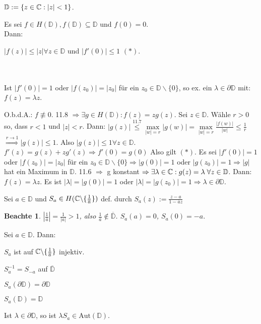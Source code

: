 \documentclass[a4paper,twoside,DIV15,BCOR12mm]{scrbook}
\def\MdD{\mathbb{D}}
\def\Rand{\partial}
\def\Aut{\text{Aut}}
\newtheorem{beachte}{Beachte}
\begin{document}
$\MdD := \{ z\in\MdC: |z|<1\}$.

\begin{satz}
Es sei $f\in H(\MdD), f(\MdD) \subseteq \MdD$ und $f(0) = 0$. \\
Dann: \\  \centerline{$|f(z)| \leq |z| \forall z \in \MdD$ und $|f'(0)|\leq 1$ $(*)$. } \\  \\ Ist $|f'(0)|=1$ oder $|f(z_0)| = |z_0|$ für ein $z_0 \in \MdD \backslash \{0\}$, so ex. ein $\lambda \in \Rand \MdD$ mit: $f(z)=\lambda z$.
\end{satz}

\begin{beweis}
O.b.d.A.: $f\not\equiv 0$. 11.8 $\Rightarrow \exists g \in H(\MdD): f(z) = zg(z)$. Sei $z \in \MdD$. Wähle $r>0$ so, dass $r<1$ und $|z| < r$. Dann: $|g(z)| \stackrel{\text{11.7}}{\leq} \max\limits_{|w|=r} |g(w)| = \max\limits_{|w|=r} \frac{|f(w)|}{|w|} \leq \frac{1}{r} $ $\stackrel{r \rightarrow 1}{\Rightarrow} |g(z)| \leq1$. Also $|g(z)| \leq 1 \forall z \in \MdD$. 
$f'(z) = g(z) + zg'(z) \Rightarrow f'(0) = g(0)$ Also gilt $(*)$.
Es sei $|f'(0)| = 1$ oder $|f(z_0)| = |z_0|$ für ein $z_0 \in \MdD \backslash \{0\} \Rightarrow  |g(0)| = 1$ oder $|g(z_0)| = 1 \Rightarrow |g|$ hat ein Maximum in $\MdD$. 11.6 $\Rightarrow$ g konstant $\Rightarrow \exists \lambda \in \MdC: g(z) = \lambda \;\forall z \in \MdD$. Dann: $f(z) = \lambda z$. Es ist $|\lambda| = |g(0)| = 1$ oder $|\lambda| = |g(z_0)| = 1 \Rightarrow \lambda \in \partial \MdD$.
\end{beweis}

\begin{definition}
Sei $a\in\MdD$ und $S_a \in H(\mathbb{C} \backslash \{ \frac{1}{\overline{a}}\})$ def. durch $S_a(z) := \frac{z-a}{1-\overline{a}z}$
\end{definition}

\begin{beachte}
$|\frac{1}{\overline{a}}| = \frac{1}{|a|} > 1$, also $\frac{1}{\overline{a}} \notin \overline{\MdD}$. $S_a(a) = 0$, $S_a(0) = -a$.
\end{beachte}

\begin{satz}
Sei $a \in \MdD$. Dann:
\begin{liste}
\item $S_a$ ist auf $\mathbb{C} \backslash \{\frac{1}{\overline{a}}\}$ injektiv.
\item $S_a^{-1} = S_{-a}$ auf $\overline{\MdD}$
\item $S_a(\partial \MdD) = \partial \MdD$
\item $S_a(\MdD) = \MdD$
\item Ist $\lambda \in \partial \MdD$, so ist $\lambda S_a \in \Aut(\MdD)$.
\end{liste}
\end{satz}
\end{document}
